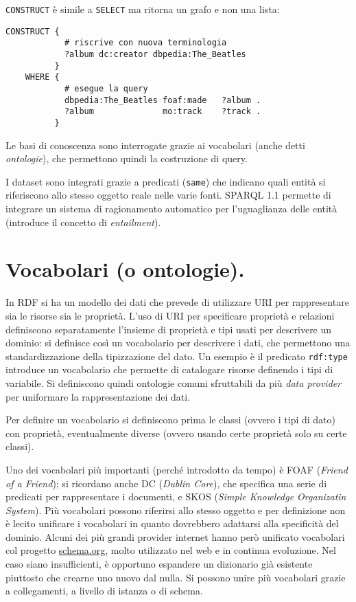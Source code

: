 \documentclass[11pt]{article}
\begin{document}
\verb|CONSTRUCT| è simile a \verb|SELECT| ma ritorna un grafo e non una lista:
\begin{verbatim}
CONSTRUCT {
            # riscrive con nuova terminologia
            ?album dc:creator dbpedia:The_Beatles
          }
    WHERE {
            # esegue la query
            dbpedia:The_Beatles foaf:made   ?album .
            ?album              mo:track    ?track .
          }
\end{verbatim}
\begin{multicols}{2}
  
Le basi di conoscenza sono interrogate grazie ai vocabolari (anche detti \textit{ontologie}), che permettono quindi la costruzione di query.

I dataset sono integrati grazie a predicati (\verb|same|) che indicano quali entità si riferiscono allo stesso oggetto reale nelle varie fonti.
SPARQL 1.1 permette di integrare un sistema di ragionamento automatico per l'uguaglianza delle entità (introduce il concetto di \textit{entailment}).

\section{Vocabolari (o ontologie).}
In RDF si ha un modello dei dati che prevede di utilizzare URI per rappresentare sia le risorse sia le proprietà.
L'uso di URI per specificare proprietà e relazioni definiscono separatamente l'insieme di proprietà e tipi usati per descrivere un dominio: si definisce così un vocabolario per descrivere i dati, che permettono una standardizzazione della tipizzazione del dato.
Un esempio è il predicato \verb|rdf:type| introduce un vocabolario che permette di catalogare risorse definendo i tipi di variabile.
Si definiscono quindi ontologie comuni sfruttabili da più \textit{data provider} per uniformare la rappresentazione dei dati.

Per definire un vocabolario si definiscono prima le classi (ovvero i tipi di dato) con proprietà, eventualmente diverse (ovvero usando certe proprietà solo su certe classi).

Uno dei vocabolari più importanti (perché introdotto da tempo) è FOAF (\textit{Friend of a Friend}); si ricordano anche DC (\textit{Dublin Core}), che specifica una serie di predicati per rappresentare i documenti, e SKOS (\textit{Simple Knowledge Organizatin System}).
Più vocabolari possono riferirsi allo stesso oggetto e per definizione non è lecito unificare i vocabolari in quanto dovrebbero adattarsi alla specificità del dominio.
Alcuni dei più grandi provider internet hanno però unificato vocabolari col progetto \url{schema.org}, molto utilizzato nel web e in continua evoluzione.
Nel caso siano insufficienti, è opportuno espandere un dizionario già esistente piuttosto che crearne uno nuovo dal nulla.
Si possono unire più vocabolari grazie a collegamenti, a livello di istanza o di schema.


\end{multicols}
\end{document}
